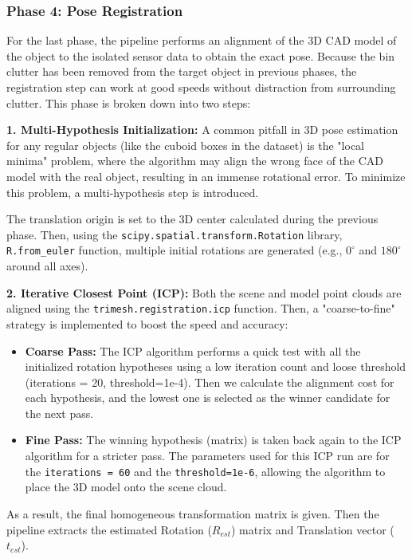 \subsubsection{Phase 4: Pose Registration}
For the last phase, the pipeline performs an alignment of the 3D CAD model of the object to the isolated sensor data to obtain the exact pose. Because the bin clutter has been removed from the target object in previous phases, the registration step can work at good speeds without distraction from surrounding clutter. This phase is broken down into two steps:

\textbf{1. Multi-Hypothesis Initialization:}
A common pitfall in 3D pose estimation for any regular objects (like the cuboid boxes in the dataset) is the "local minima" problem, where the algorithm may align the wrong face of the CAD model with the real object, resulting in an immense rotational error. To minimize this problem, a multi-hypothesis step is introduced.

The translation origin is set to the 3D center calculated during the previous phase. Then, using the \texttt{scipy.spatial.transform.Rotation} library, \texttt{R.from\_euler} function, multiple initial rotations are generated (e.g., $0^\circ$ and $180^\circ$ around all axes).

\textbf{2. Iterative Closest Point (ICP):}
Both the scene and model point clouds are aligned using the \texttt{trimesh.registration.icp} function. Then, a "coarse-to-fine" strategy is implemented to boost the speed and accuracy:

\begin{itemize}
    \item \textbf{Coarse Pass:} The ICP algorithm performs a quick test with all the initialized rotation hypotheses using a low iteration count and loose threshold (iterations = 20, threshold=1e-4). Then we calculate the alignment cost for each hypothesis, and the lowest one is selected as the winner candidate for the next pass.
    
    \item \textbf{Fine Pass:} 
    The winning hypothesis (matrix) is taken back again to the ICP algorithm for a stricter pass. The parameters used for this ICP run are for the \texttt{iterations = 60} and the \texttt{threshold=1e-6}, allowing the algorithm to place the 3D model onto the scene cloud.
\end{itemize}

As a result, the final homogeneous transformation matrix is given. Then the pipeline extracts the estimated Rotation ($R_{est}$) matrix and Translation vector ($t_{est}$).